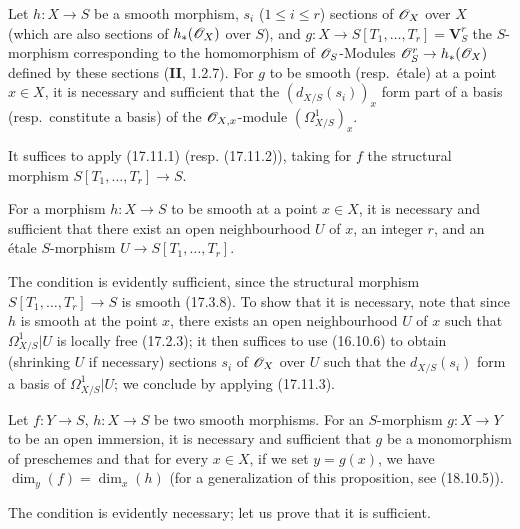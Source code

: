 \begin{corollary}[17.11.3]
\label{IV.17.11.3}
Let $h:X\to S$ be a smooth morphism, $s_i$ \textup{($1\leq i\leq r$)} sections of $\mathscr{O}_X$ over $X$ \textup{(}which are also sections of $h_*(\mathscr{O}_X)$ over $S$\textup{)}, and $g:X\to S[T_1,\ldots,T_r]=\mathbf{V}_S^r$ the $S$-morphism corresponding to the homomorphism of $\mathscr{O}_S$-Modules $\mathscr{O}_S^r\to h_*(\mathscr{O}_X)$ defined by these sections \textup{(\textbf{II}, 1.2.7)}. For $g$ to be smooth \textup{(resp.}\ étale\textup{)} at a point $x\in X$, it is necessary and sufficient that the $(d_{X/S}(s_i))_x$ form part of a basis \textup{(resp.}\ constitute a basis\textup{)} of the $\mathscr{O}_{X,x}$-module $(\varOmega^1_{X/S})_x$.
\end{corollary}

It suffices to apply (17.11.1) (resp. (17.11.2)), taking for $f$ the structural morphism $S[T_1,\ldots,T_r]\to S$.

\begin{corollary}[17.11.4]
\label{IV.17.11.4}
For a morphism $h:X\to S$ to be smooth at a point $x\in X$, it is necessary and sufficient that there exist an open neighbourhood $U$ of $x$, an integer $r$, and an étale $S$-morphism $U\to S[T_1,\ldots,T_r]$.
\end{corollary}


The condition is evidently sufficient, since the structural morphism $S[T_1,\ldots,T_r]\to S$ is smooth (17.3.8). To show that it is necessary, note that since $h$ is smooth at the point $x$, there exists an open neighbourhood $U$ of $x$ such that $\varOmega^1_{X/S}|U$ is locally free (17.2.3); it then suffices to use (16.10.6) to obtain (shrinking $U$ if necessary) sections $s_i$ of $\mathscr{O}_X$ over $U$ such that the $d_{X/S}(s_i)$ form a basis of $\varOmega^1_{X/S}|U$; we conclude by applying (17.11.3).

\begin{proposition}[17.11.5]
\label{IV.17.11.5}
Let $f:Y\to S$, $h:X\to S$ be two smooth morphisms. For an $S$-morphism $g:X\to Y$ to be an open immersion, it is necessary and sufficient that $g$ be a monomorphism of preschemes and that for every $x\in X$, if we set $y=g(x)$, we have $\dim_y(f)=\dim_x(h)$ \textup{(for a generalization of this proposition, see (18.10.5))}.
\end{proposition}

The condition is evidently necessary; let us prove that it is sufficient.


